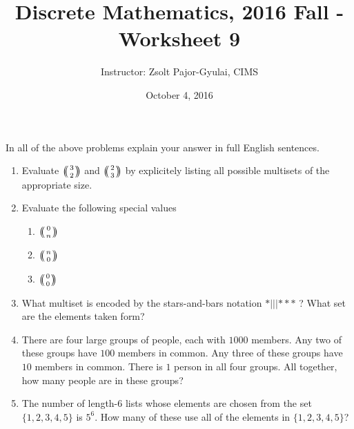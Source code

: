 \documentclass[11pt]{preprint}
\title{Discrete Mathematics, 2016 Fall - Worksheet 9}
\author{Instructor: Zsolt Pajor-Gyulai, CIMS}
\date{October 4, 2016}
\def\enumb{\begin{enumerate}}
\def\enume{\end{enumerate}}
\def\multiset#1#2{\ensuremath{\left(\kern-.3em\left(\genfrac{}{}{0pt}{}{#1}{#2}\right)\kern-.3em\right)}}
\begin{document}
\maketitle

In all of the above problems explain your answer in full English sentences.

\enumb
\item Evaluate $\multiset{3}{2}$ and $\multiset{2}{3}$ by explicitely listing all possible multisets of the appropriate size.
\item Evaluate the following special values
\enumb
\item \multiset{0}{n}
\item \multiset{n}{0}
\item \multiset{0}{0}
\enume

\item What multiset is encoded by the stars-and-bars notation $*|||***$ ? What set are the elements taken form?


\item There are four large groups of people, each with $1000$ members. Any two of these groups have $100$ members in common. Any three of these groups have $10$ members in common. There is $1$ person in all four groups. All together, how many people are in these groups?

\item The number of length-$6$ lists whose elements are chosen from the set $\{1,2,3,4,5\}$ is $5^6$. How many of these use all of the elements in $\{1,2,3,4,5\}$?
\enume
\end{document}
